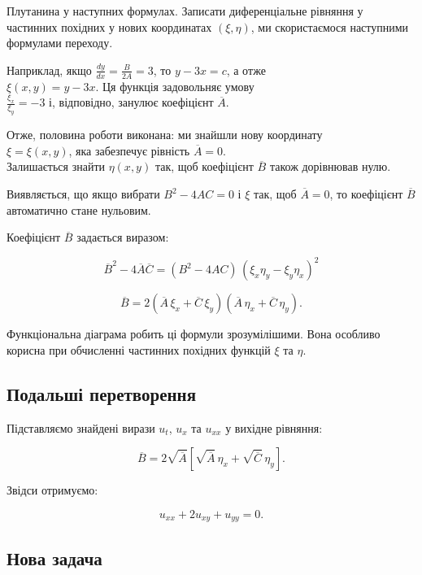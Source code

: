 Плутанина у наступних формулах. Записати диференціальне рівняння у частинних похідних у нових координатах \((\xi, \eta)\), ми скористаємося наступними формулами переходу.

Наприклад, якщо \(\frac{dy}{dx} = \frac{B}{2A} = 3\), то \(y - 3x = c\), а отже\\
\(\xi(x, y) = y - 3x\). Ця функція задовольняє умову\\
\(\frac{\xi_x}{\xi_y} = -3\) і, відповідно, занулює коефіцієнт \(\overline{A}\).

Отже, половина роботи виконана: ми знайшли нову координату\\
\(\xi = \xi(x, y)\), яка забезпечує рівність \(\overline{A} = 0\).\\
Залишається знайти \(\eta(x, y)\) так, щоб коефіцієнт \(\overline{B}\) також дорівнював нулю.

Виявляється, що якщо вибрати \(B^2 - 4AC = 0\) і \(\xi\) так, щоб \(\overline{A} = 0\), то коефіцієнт \(\overline{B}\) автоматично стане нульовим.

Коефіцієнт \(\overline{B}\) задається виразом:

\[
\overline{B}^2 - 4\overline{A}\overline{C} = (B^2 - 4AC)\,(\xi_x \eta_y - \xi_y \eta_x)^2
\]

\[
\overline{B} = 2\left( \overline{A}\,\xi_x + \overline{C}\,\xi_y \right)
\left( \overline{A}\,\eta_x + \overline{C}\,\eta_y \right).
\]

Функціональна діаграма робить ці формули зрозумілішими. Вона особливо корисна при обчисленні частинних похідних функцій \(\xi\) та \(\eta\).

\subsection{Подальші перетворення}\label{ux43fux43eux434ux430ux43bux44cux448ux456-ux43fux435ux440ux435ux442ux432ux43eux440ux435ux43dux43dux44f}

Підставляємо знайдені вирази \(u_t\), \(u_x\) та \(u_{xx}\) у вихідне рівняння:

\[
\overline{B} = 2\sqrt{\overline{A}} \left[ \sqrt{\overline{A}}\, \eta_x + \sqrt{\overline{C}}\, \eta_y \right].
\]

Звідси отримуємо:

\[
u_{xx} + 2u_{xy} + u_{yy} = 0.
\]

\subsection{Нова задача}\label{ux43dux43eux432ux430-ux437ux430ux434ux430ux447ux430}

